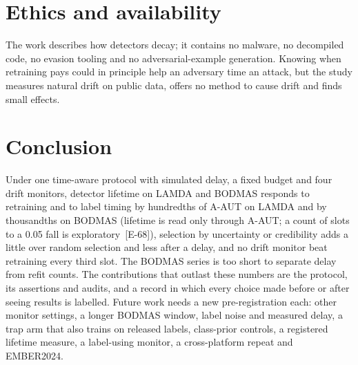 \documentclass[conference,a4paper]{IEEEtran}
\newcommand{\clm}[1]{{\scriptsize[#1]}}
\begin{document}
\section{Ethics and availability}
The work describes how detectors decay; it contains no malware, no decompiled code, no evasion tooling and no adversarial-example generation. Knowing when retraining pays could in principle help an adversary time an attack, but the study measures natural drift on public data, offers no method to cause drift and finds small effects.



\section{Conclusion}
Under one time-aware protocol with simulated delay, a fixed budget and four drift monitors, detector lifetime on LAMDA and BODMAS responds to retraining and to label timing by hundredths of A-AUT on LAMDA and by thousandths on BODMAS (lifetime is read only through A-AUT; a count of slots to a 0.05 fall is exploratory~\clm{E-68}), selection by uncertainty or credibility adds a little over random selection and less after a delay, and no drift monitor beat retraining every third slot. The BODMAS series is too short to separate delay from refit counts. The contributions that outlast these numbers are the protocol, its assertions and audits, and a record in which every choice made before or after seeing results is labelled. Future work needs a new pre-registration each: other monitor settings, a longer BODMAS window, label noise and measured delay, a trap arm that also trains on released labels, class-prior controls, a registered lifetime measure, a label-using monitor, a cross-platform repeat and EMBER2024.



\end{document}

